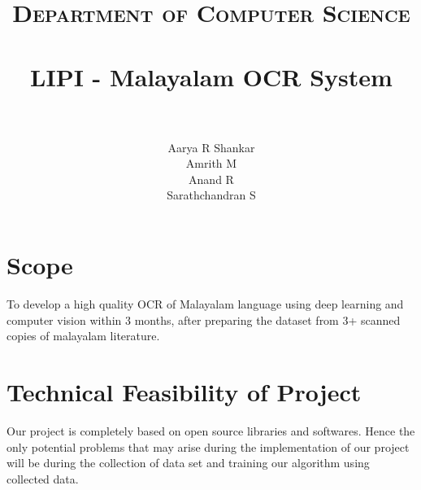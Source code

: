\documentclass[paper=a4, fontsize=11pt]{scrartcl}
\title{
		\usefont{OT1}{bch}{b}{n}
		\normalfont \normalsize \textsc{Department of Computer Science} \\ [25pt]
		\horrule{0.5pt} \\[0.4cm]
		\huge LIPI - Malayalam OCR System \\
		\horrule{2pt} \\[0.5cm]
}
\author{
		\normalfont 								\normalsize
        Aarya R Shankar\\[-3pt]		\normalsize
        Amrith M\\[-3pt]		\normalsize
        Anand R\\[-3pt]		\normalsize
        \newline
        Sarathchandran S\\[-3pt]		\normalsize        
}
\date{}
\numberwithin{equation}{section}		%
\numberwithin{figure}{section}			%
\numberwithin{table}{section}				%
\begin{document}
\maketitle
\section{Scope}
To develop a high quality OCR of Malayalam language using deep learning and computer vision within 3 months, after preparing the dataset from 3+ scanned copies of malayalam literature.





\section{ Technical Feasibility of Project}
Our project is completely based on open source libraries and softwares. Hence the only potential problems that may arise during the implementation of our project will be during the collection of data set and training our algorithm using collected data.
\end{document}

